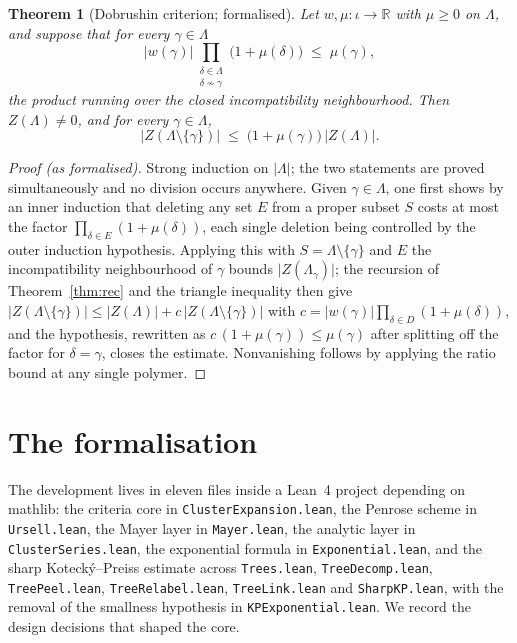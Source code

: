 \documentclass[11pt]{amsart}
\newtheorem{theorem}{Theorem}[section]
\begin{document}
\begin{theorem}[Dobrushin criterion; formalised]\label{thm:dob}
Let $w, \mu \colon \iota \to \mathbb{R}$ with $\mu \ge 0$ on $\Lambda$, and
suppose that for every $\gamma \in \Lambda$
\[
  \lvert w(\gamma)\rvert \prod_{\substack{\delta \in \Lambda \\ \delta
  \nsim \gamma}} \bigl(1 + \mu(\delta)\bigr) \;\le\; \mu(\gamma),
\]
the product running over the closed incompatibility neighbourhood. Then
$Z(\Lambda) \neq 0$, and for every $\gamma \in \Lambda$,
\[
  \lvert Z(\Lambda \setminus \{\gamma\})\rvert \;\le\;
  \bigl(1 + \mu(\gamma)\bigr)\, \lvert Z(\Lambda)\rvert .
\]
\end{theorem}

\begin{proof}[Proof (as formalised)]
Strong induction on $\lvert\Lambda\rvert$; the two statements are proved
simultaneously and no division occurs anywhere. Given $\gamma \in \Lambda$,
one first shows by an inner induction that deleting any set $E$ from a
proper subset $S$ costs at most the factor $\prod_{\delta \in E}(1 +
\mu(\delta))$, each single deletion being controlled by the outer induction
hypothesis. Applying this with $S = \Lambda \setminus \{\gamma\}$ and $E$
the incompatibility neighbourhood of $\gamma$ bounds
$\lvert Z(\Lambda_\gamma)\rvert$; the recursion of Theorem~\ref{thm:rec}
and the triangle inequality then give
$\lvert Z(\Lambda \setminus \{\gamma\})\rvert \le \lvert Z(\Lambda)\rvert +
c\,\lvert Z(\Lambda \setminus \{\gamma\})\rvert$ with
$c = \lvert w(\gamma)\rvert \prod_{\delta \in D}(1 + \mu(\delta))$, and the
hypothesis, rewritten as $c\,(1 + \mu(\gamma)) \le \mu(\gamma)$ after
splitting off the factor for $\delta = \gamma$, closes the estimate.
Nonvanishing follows by applying the ratio bound at any single polymer.
\end{proof}

\section{The formalisation}

The development lives in eleven files inside a Lean~4 project depending
on \textsf{mathlib}: the criteria core in \texttt{ClusterExpansion.lean},
the Penrose scheme in \texttt{Ursell.lean}, the Mayer layer in
\texttt{Mayer.lean}, the analytic layer in \texttt{ClusterSeries.lean},
the exponential formula in \texttt{Exponential.lean}, and the sharp
Kotecký--Preiss estimate across \texttt{Trees.lean},
\texttt{TreeDecomp.lean}, \texttt{TreePeel.lean},
\texttt{TreeRelabel.lean}, \texttt{TreeLink.lean} and
\texttt{SharpKP.lean}, with the removal of the smallness hypothesis in
\texttt{KPExponential.lean}. We record the design decisions that shaped
the core.
\end{document}

